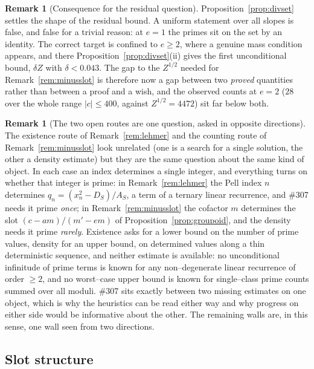\documentclass[11pt]{article}
\theoremstyle{definition}
\newtheorem{remark}[theorem]{Remark}
\begin{document}
\begin{remark}[Consequence for the residual question]\label{rem:a9repair}
Proposition~\ref{prop:divset} settles the shape of the residual bound. A uniform statement over all
slopes is false, and false for a trivial reason: at $e=1$ the primes sit on the set by an identity.
The correct target is confined to $e\ge2$, where a genuine mass condition appears, and there
Proposition~\ref{prop:divset}(ii) gives the first unconditional bound, $\delta Z$ with
$\delta<0.043$. The gap to the $Z^{1/2}$ needed for Remark~\ref{rem:minusslot} is therefore now a
gap between two \emph{proved} quantities rather than between a proof and a wish, and the observed
counts at $e=2$ ($28$ over the whole range $|c|\le400$, against $Z^{1/2}=4472$) sit far below both.
\end{remark}

\begin{remark}[The two open routes are one question, asked in opposite directions]\label{rem:onequestion}
The existence route of Remark~\ref{rem:lehmer} and the counting route of
Remark~\ref{rem:minusslot} look unrelated (one is a search for a single solution, the other a
density estimate) but they are the same question about the same kind of object. In each case an
index determines a single integer, and everything turns on whether that integer is prime: in
Remark~\ref{rem:lehmer} the Pell index $n$ determines $q_n=(x_n^2-D_S)/A_S$, a term of a ternary
linear recurrence, and \#307 needs it prime \emph{once}; in Remark~\ref{rem:minusslot} the cofactor
$m$ determines the slot $(c-am)/(m'-em)$ of Proposition~\ref{prop:groupoid}, and the density needs
it prime \emph{rarely}. Existence asks for a lower bound on the number of prime values, density for
an upper bound, on determined values along a thin deterministic sequence, and neither estimate is
available: no unconditional infinitude of prime terms is known for any non--degenerate linear
recurrence of order $\ge2$, and no worst--case upper bound is known for single--class prime counts
summed over all moduli. \#307 sits exactly between two missing estimates on one object, which is why
the heuristics can be read either way and why progress on either side would be informative about the
other. The remaining walls are, in this sense, one wall seen from two directions.
\end{remark}

\subsection{Slot structure}\label{ssec:slotstructure}
\end{document}
